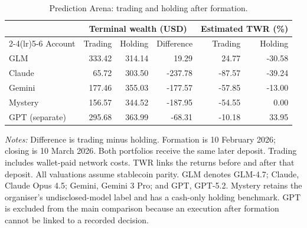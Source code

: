 \begin{table}[htbp]
\centering\small
\caption{Prediction Arena: trading and holding after formation.}
\label{tab:predictionarena}
\begin{tabular}{lrrrrr}
\toprule
 & \multicolumn{3}{c}{Terminal wealth (USD)} & \multicolumn{2}{c}{Estimated TWR (\%)}\\
\cmidrule(lr){2-4}\cmidrule(lr){5-6}
Account & Trading & Holding & Difference & Trading & Holding\\
\midrule
GLM & 333.42 & 314.14 & 19.29 & 24.77 & -30.58 \\
Claude & 65.72 & 303.50 & -237.78 & -87.57 & -39.24 \\
Gemini & 177.46 & 355.03 & -177.57 & -57.85 & -13.00 \\
Mystery & 156.57 & 344.52 & -187.95 & -54.55 & 0.00 \\
GPT (separate) & 295.68 & 363.99 & -68.31 & -10.18 & 33.95 \\
\bottomrule
\end{tabular}
\begin{minipage}{0.98\linewidth}\footnotesize
\textit{Notes:} Difference is trading minus holding. Formation is 10 February
2026; closing is 10 March 2026. Both portfolios receive the same later deposit.
Trading includes wallet-paid network costs. TWR links the returns before and
after that deposit. All valuations assume stablecoin parity. GLM denotes
GLM-4.7; Claude, Claude Opus 4.5; Gemini, Gemini 3 Pro; and GPT, GPT-5.2.
Mystery retains the organiser's undisclosed-model label and has a cash-only
holding benchmark. GPT is excluded from the main comparison because an
execution after formation cannot be linked to a recorded decision.
\end{minipage}
\end{table}
